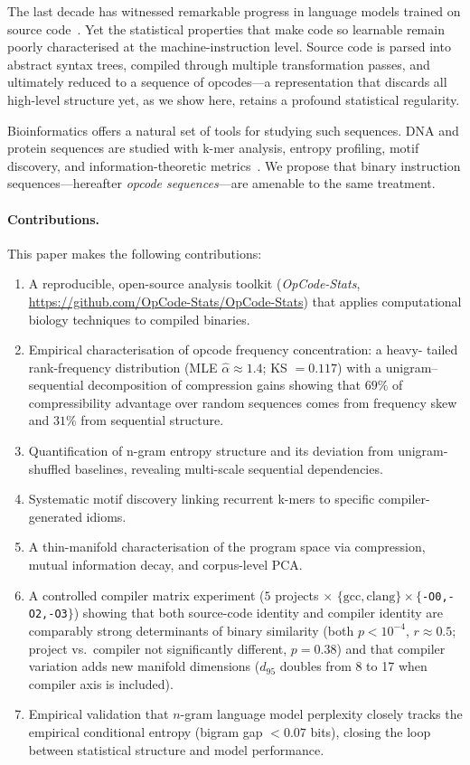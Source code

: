 \documentclass[10pt,twocolumn]{article}
\begin{document}
The last decade has witnessed remarkable progress in language models trained on
source code~\cite{chen2021codex,austin2021program}.  Yet the statistical
properties that make code so learnable remain poorly characterised at the
machine-instruction level.  Source code is parsed into abstract syntax trees,
compiled through multiple transformation passes, and ultimately reduced to a
sequence of opcodes---a representation that discards all high-level structure
yet, as we show here, retains a profound statistical regularity.

Bioinformatics offers a natural set of tools for studying such sequences.  DNA
and protein sequences are studied with k-mer analysis, entropy profiling,
motif discovery, and information-theoretic metrics~\cite{vinga2003alignment}.
We propose that binary instruction sequences---hereafter \emph{opcode
sequences}---are amenable to the same treatment.

\paragraph{Contributions.}  This paper makes the following contributions:
\begin{enumerate}
  \item A reproducible, open-source analysis toolkit (\emph{OpCode-Stats},
        \url{https://github.com/OpCode-Stats/OpCode-Stats}) that applies computational
        biology techniques to compiled binaries.
  \item Empirical characterisation of opcode frequency concentration: a heavy-
        tailed rank-frequency distribution (MLE $\hat{\alpha}\!\approx\!1.4$;
        KS $= 0.117$) with a unigram--sequential decomposition of compression
        gains showing that $69\%$ of compressibility advantage over random
        sequences comes from frequency skew and $31\%$ from sequential
        structure.
  \item Quantification of n-gram entropy structure and its deviation from
        unigram-shuffled baselines, revealing multi-scale sequential
        dependencies.
  \item Systematic motif discovery linking recurrent k-mers to specific
        compiler-generated idioms.
  \item A thin-manifold characterisation of the program space via compression,
        mutual information decay, and corpus-level PCA.
  \item A controlled compiler matrix experiment ($5$ projects $\times$
        $\{\text{gcc},\text{clang}\} \times \{$\texttt{-O0,-O2,-O3}$\}$) showing
        that both source-code identity and compiler identity are comparably
        strong determinants of binary similarity (both $p < 10^{-4}$,
        $r \approx 0.5$; project vs.\ compiler not significantly different,
        $p = 0.38$) and that compiler variation adds new manifold dimensions
        ($d_{95}$ doubles from 8 to 17 when compiler axis is included).
  \item Empirical validation that $n$-gram language model perplexity closely
        tracks the empirical conditional entropy (bigram gap $< 0.07$ bits),
        closing the loop between statistical structure and model performance.
\end{enumerate}
\end{document}
